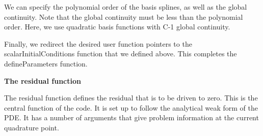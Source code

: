 \begin{DoxyCodeInclude}

\end{DoxyCodeInclude}


We can specify the polynomial order of the basis splines, as well as the global continuity. Note that the global continuity must be less than the polynomial order. Here, we use quadratic basis functions with C-\/1 global continuity.


\begin{DoxyCodeInclude}

\end{DoxyCodeInclude}


Finally, we redirect the desired user function pointers to the {\ttfamily scalar\-Initial\-Conditions} function that we defined above. This completes the {\ttfamily define\-Parameters} function.


\begin{DoxyCodeInclude}

\end{DoxyCodeInclude}


{\bfseries  The {\ttfamily residual} function }

The residual function defines the residual that is to be driven to zero. This is the central function of the code. It is set up to follow the analytical weak form of the P\-D\-E. It has a number of arguments that give problem information at the current quadrature point.


\begin{DoxyCodeInclude}

\end{DoxyCodeInclude}


